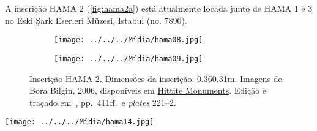 A inscrição HAMA 2 (\autoref{fig:hama2a}) está atualmente locada junto de HAMA
1 e 3 no Eski Şark Eserleri Müzesi, Istabul (no. 7890).

\begin{figure}[h]
	\centering
	\begin{subfigure}{0.49\textwidth}
		\texttt{[image: ../../../Mídia/hama08.jpg]}
	\end{subfigure}
	\begin{subfigure}{0.49\textwidth}
		\texttt{[image: ../../../Mídia/hama09.jpg]}
	\end{subfigure}
	\caption[HAMA 2]{Inscrição HAMA 2. Dimensões da inscrição:
		0.36\times0.31m.
		Imagens de Bora Bilgin, 2006,
		disponíveis em
		\href{https://www.hittitemonuments.com/hama/}{Hittite Monuments}.
		Edição e traçado em~, pp.\ 411ff.\ e \emph{plates}
		221--2.
	}\label{fig:hama2a}
\end{figure}

\clearpage%


\begin{center}
	\texttt{[image: ../../../Mídia/hama14.jpg]}
\end{center}


\begin{parnumbersa}[]
	\raggedright%

	\Large {}\hspace{5pt}
	\hspace{5pt}
	\hspace{5pt}
	\hspace{5pt}
	\hspace{5pt}


	\Large {}\hspace{5pt}
	\hspace{5pt}
	\hspace{5pt}
	\hspace{5pt}
	\hspace{5pt}
	\hspace{5pt}

	\Large {} \hspace{5pt}
	\hspace{5pt}
	\hspace{5pt}

\end{parnumbersa}

